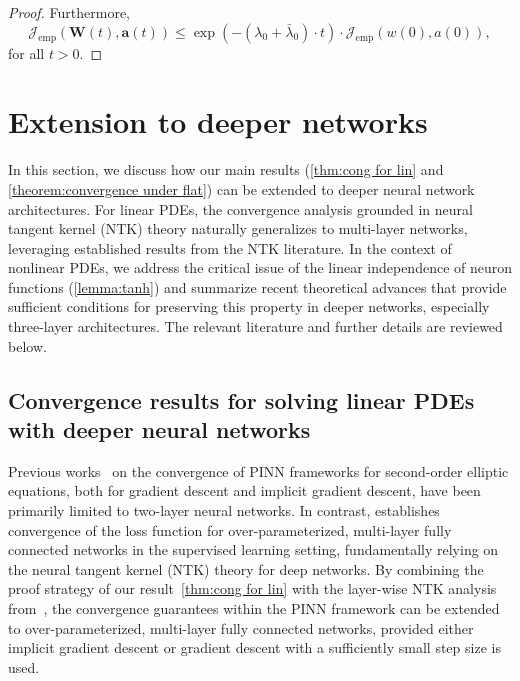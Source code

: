 \documentclass{article}
\begin{document}
\begin{proof}
Furthermore,
\begin{equation*}
\mathcal{J}_{\text{emp}}(\mathbf{W}(t), \mathbf{a}(t)) \leq \exp\left( -(\lambda_0 + \bar{\lambda}_0) \cdot t \right) \cdot \mathcal{J}_{\text{emp}}(w(0), a(0)),
\end{equation*}
for all \(t > 0\).
\end{proof}

\section{Extension to deeper networks}\label{sec:deeper networks}
In this section, we discuss how our main results (\cref{thm:cong for lin} and \cref{theorem:convergence under flat}) can be extended to deeper neural network architectures. 
For linear PDEs, the convergence analysis grounded in neural tangent kernel (NTK) theory naturally generalizes to multi-layer networks, leveraging established results from the NTK literature. 
In the context of nonlinear PDEs, we address the critical issue of the linear independence of neuron functions (\cref{lemma:tanh}) and summarize recent theoretical advances that provide sufficient conditions for preserving this property in deeper networks, especially three-layer architectures. 
The relevant literature and further details are reviewed below.

\subsection{Convergence results for solving linear PDEs with deeper neural networks}\label{sec:deeper linear}
Previous works~\citep{GD_cong_PINN,IGD} on the convergence of PINN frameworks for second-order elliptic equations, both for gradient descent and implicit gradient descent, have been primarily limited to two-layer neural networks. 
In contrast, \cite{du2018gradient} establishes convergence of the loss function for over-parameterized, multi-layer fully connected networks in the supervised learning setting, fundamentally relying on the neural tangent kernel (NTK) theory for deep networks. 
By combining the proof strategy of our result~\cref{thm:cong for lin} with the layer-wise NTK analysis from~\cite{du2018gradient}, the convergence guarantees within the PINN framework can be extended to over-parameterized, multi-layer fully connected networks, provided either implicit gradient descent or gradient descent with a sufficiently small step size is used. 
\end{document}
